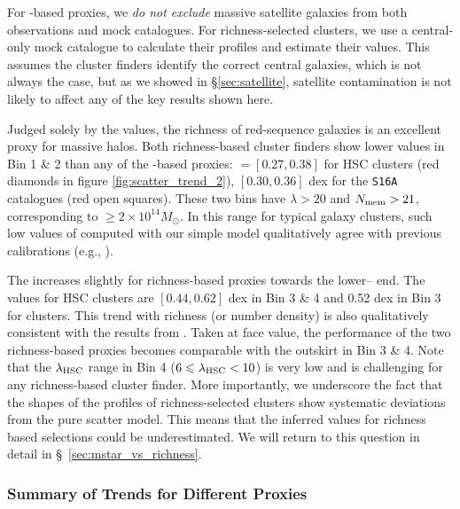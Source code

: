 \documentclass[fleqn,usenatbib,useAMS]{mnras}
\begin{document}
\begin{CJK*}{UTF8}{gbsn}
    For \mstar{}-based proxies, we \emph{do not exclude} massive satellite galaxies from both
    observations and mock catalogues.
    For richness-selected clusters, we use a central-only mock catalogue to calculate their \dsigma{}
    profiles and estimate their \sigmvir{} values. 
    This assumes the cluster finders identify the correct central galaxies, which is not always the
    case, but as we showed in \S\ref{sec:satellite}, satellite contamination is not likely to affect
    any of the key results shown here.
    
    Judged solely by the \sigmvir{} values, the richness of red-sequence galaxies is an excellent
    \mvir{} proxy for massive halos.
    Both richness-based cluster finders show lower \sigmvir{} values in Bin 1 \& 2 than any of the
    \mstar{}-based \mvir{} proxies:
    \sigmvir{}$=[0.27, 0.38]$ for HSC \redm{} clusters (red diamonds in figure
    \ref{fig:scatter_trend_2}), $[0.30, 0.36]$ dex for the \camira{} \texttt{S16A} catalogues (red
    open squares).
    These two bins have \redm{} $\lambda > 20$ and \camira{} $N_{\rm mem} > 21$,
    corresponding to \mvir{}$\geq 2\times 10^{14} M_{\odot}$.
    In this \mvir{} range for typical galaxy clusters, such low values of \sigmvir{} computed with
    our simple model qualitatively agree with previous calibrations (e.g., \citealt{Murata2018,
    Murata2019}).

    The \sigmvir{} increases slightly for richness-based proxies towards the lower--\mvir{} end.
    The \sigmvir{} values for HSC \redm{} clusters are $[0.44, 0.62]$ dex in Bin 3 \& 4 and 0.52 dex
    in Bin 3 for \camira{} clusters.
    This trend with richness (or number density) is also qualitatively consistent with the results
    from \citet{Murata2018, Murata2019}.
    Taken at face value, the performance of the two richness-based proxies becomes comparable with
    the outskirt \mstar{} in Bin 3 \& 4.
    Note that the $\lambda_{\rm HSC}$ range in Bin 4 ($6 \leq \lambda_{\rm HSC} < 10$) is 
    very low and is challenging for any richness-based cluster finder.
    More importantly, we underscore the fact that the shapes of the \dsigma{} profiles of
    richness-selected clusters show systematic deviations from the pure scatter model. 
    This means that the inferred \sigmvir{} values for richness based selections could be
    underestimated. 
    We will return to this question in detail in \S\ \ref{sec:mstar_vs_richness}.

\subsubsection{Summary of \sigmvir{} Trends for Different \mvir{} Proxies}
    \label{sec:trend}


\end{CJK*}
\end{document}

